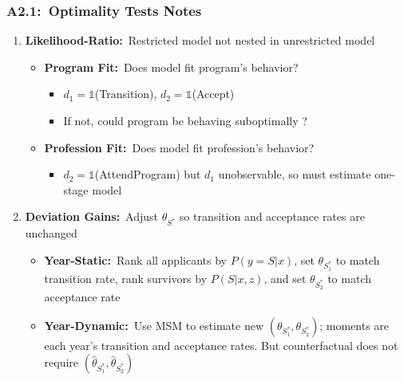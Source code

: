 \documentclass[12pt, aspectratio=169]{beamer}
\begin{document}
\begin{frame}[label=otn]
\frametitle{A2.1:\ Optimality Tests Notes}
\begin{enumerate}
\item \textbf{Likelihood-Ratio:}\ Restricted model not nested in unrestricted model \citep{vuong1989}\!\!\!
\vspace{5pt}
\begin{itemize}
\item \textbf{Program Fit:}\ Does model fit program's behavior?
\vspace{2.5pt}
\begin{itemize}
\item $d_1 = \mathds{1}$(Transition), $d_2 = \mathds{1}$(Accept)
\vspace{2.5pt}
\item If not, could program be behaving suboptimally \citep{simon1956}?
\vspace{5pt}
\end{itemize}
\item \textbf{Profession Fit:}\ Does model fit profession's behavior?
\vspace{2.5pt}
\begin{itemize}
\item $d_2 = \mathds{1}$(AttendProgram) but $d_1$ unobservable, so must estimate one-stage model
\vspace{10pt}
\end{itemize}
\end{itemize}
\item \textbf{Deviation Gains:}\ Adjust $\theta_{S^*}$ so transition and acceptance rates are unchanged
\vspace{5pt}
\begin{itemize}
\item \textbf{Year-Static:}\ Rank all applicants by $P(y=S|x)$, set $\theta_{S_1^*}$ to match transition rate, rank survivors by $P(S|x,z)$, and set $\theta_{S_2^*}$ to match acceptance rate
\vspace{5pt}
\item \textbf{Year-Dynamic:}\ Use MSM to estimate new $(\theta_{S_1^*},\theta_{S_2^*})$; moments are each year's transition and acceptance rates. But counterfactual does not require $(\hat\theta_{S_1^*},\hat\theta_{S_2^*})$
\vspace{10pt}
\end{itemize}
\end{enumerate}
\hyperlink{lrdgt}{}
\end{frame}
\end{document}
